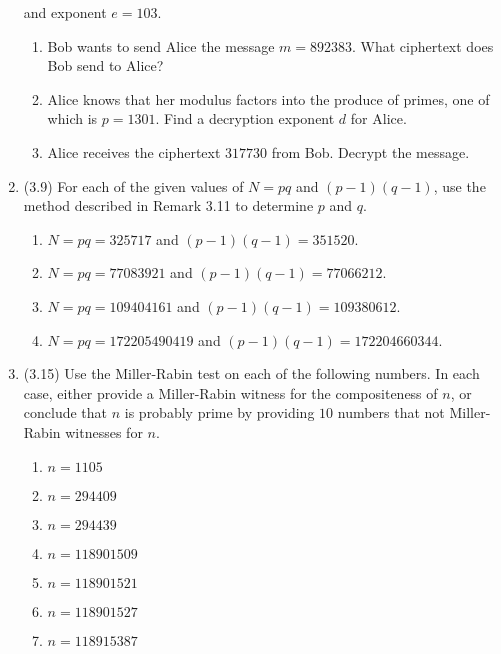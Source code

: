 \documentclass[12pt]{amsart}
\theoremstyle{definition}
\begin{document}
\begin{enumerate}
		and exponent $e=103$. 
	\begin{enumerate}
		\item Bob wants to send Alice the message $m=892383$. What 
			ciphertext does Bob send to Alice?
		\item Alice knows that her modulus factors into the produce of 
			primes, one of which is $p=1301$. Find a decryption 
			exponent $d$ for Alice. 
		\item Alice receives the ciphertext $317730$ from Bob. Decrypt 
			the message.
	\end{enumerate}
	\item (3.9) For each of the given values of $N = pq$ and $(p-1)(q-1)$, use 
		the method described in Remark 3.11 to determine $p$ and $q$. 
	\begin{enumerate}
		\item $N = pq = 325717$ and $(p-1)(q-1) = 351520$. 
		\item $N = pq = 77083921$ and $(p-1)(q-1) = 77066212$. 
		\item $N = pq = 109404161$ and $(p-1)(q-1) = 109380612$. 
		\item $N = pq = 172205490419$ and $(p-1)(q-1) = 172204660344$. 
	\end{enumerate}
	\item (3.15) Use the Miller-Rabin test on each of the following numbers. 
		In each case, either provide a Miller-Rabin witness for the 
		compositeness of $n$, or conclude that $n$ is probably prime 
		by providing $10$ numbers that not Miller-Rabin witnesses for 
		$n$. 
	\begin{enumerate}
		\item $n=1105$ 
		\item $n=294409$ 
		\item $n=294439$ 
		\item $n=118901509$ 
		\item $n=118901521$ 
		\item $n=118901527$ 
		\item $n=118915387$ 
	\end{enumerate}
\end{enumerate}
\end{document}
